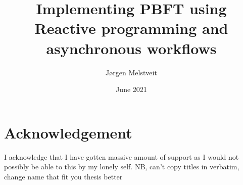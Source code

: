 \documentclass[12pt, a4paper]{report}
\numberwithin{figure}{section}
\numberwithin{table}{section}
\begin{document}
	\hspace*{-7mm}
	\vspace*{-15mm}
	\thispagestyle{empty}
	\newpage

	
	
	\title{Implementing PBFT using Reactive programming and asynchronous workflows}
	\author{Jørgen Melstveit}
	\date{June 2021}
	\maketitle
	\tableofcontents
	\newpage
	
	\section*{Acknowledgement}
	I acknowledge that I have gotten massive amount of support as I would not possibly be able to this by my lonely self. 	
	NB, can't copy titles in verbatim, change name that fit you thesis better
	\newpage
	
\end{document}
